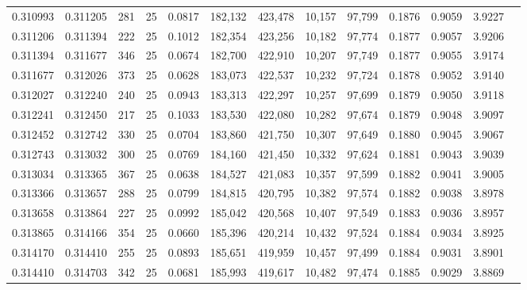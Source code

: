 \begin{tabular}{rrrrrrrrrrrrr}
0.310993 & 0.311205 &   281 &  25 &                                     0.0817 & 182,132 & 423,478 &  10,157 &  97,799 & 0.1876 & 0.9059 & 3.9227 \\
0.311206 & 0.311394 &   222 &  25 &                                     0.1012 & 182,354 & 423,256 &  10,182 &  97,774 & 0.1877 & 0.9057 & 3.9206 \\
0.311394 & 0.311677 &   346 &  25 &                                     0.0674 & 182,700 & 422,910 &  10,207 &  97,749 & 0.1877 & 0.9055 & 3.9174 \\
0.311677 & 0.312026 &   373 &  25 &                                     0.0628 & 183,073 & 422,537 &  10,232 &  97,724 & 0.1878 & 0.9052 & 3.9140 \\
0.312027 & 0.312240 &   240 &  25 &                                     0.0943 & 183,313 & 422,297 &  10,257 &  97,699 & 0.1879 & 0.9050 & 3.9118 \\
0.312241 & 0.312450 &   217 &  25 &                                     0.1033 & 183,530 & 422,080 &  10,282 &  97,674 & 0.1879 & 0.9048 & 3.9097 \\
0.312452 & 0.312742 &   330 &  25 &                                     0.0704 & 183,860 & 421,750 &  10,307 &  97,649 & 0.1880 & 0.9045 & 3.9067 \\
0.312743 & 0.313032 &   300 &  25 &                                     0.0769 & 184,160 & 421,450 &  10,332 &  97,624 & 0.1881 & 0.9043 & 3.9039 \\
0.313034 & 0.313365 &   367 &  25 &                                     0.0638 & 184,527 & 421,083 &  10,357 &  97,599 & 0.1882 & 0.9041 & 3.9005 \\
0.313366 & 0.313657 &   288 &  25 &                                     0.0799 & 184,815 & 420,795 &  10,382 &  97,574 & 0.1882 & 0.9038 & 3.8978 \\
0.313658 & 0.313864 &   227 &  25 &                                     0.0992 & 185,042 & 420,568 &  10,407 &  97,549 & 0.1883 & 0.9036 & 3.8957 \\
0.313865 & 0.314166 &   354 &  25 &                                     0.0660 & 185,396 & 420,214 &  10,432 &  97,524 & 0.1884 & 0.9034 & 3.8925 \\
0.314170 & 0.314410 &   255 &  25 &                                     0.0893 & 185,651 & 419,959 &  10,457 &  97,499 & 0.1884 & 0.9031 & 3.8901 \\
0.314410 & 0.314703 &   342 &  25 &                                     0.0681 & 185,993 & 419,617 &  10,482 &  97,474 & 0.1885 & 0.9029 & 3.8869 \\

\end{tabular}

